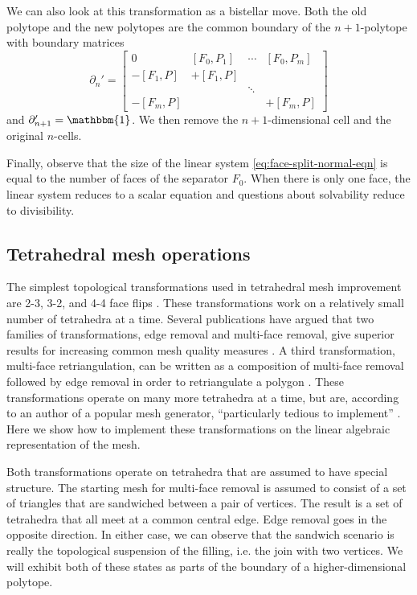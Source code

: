 \documentclass[twocolumn,leqno,twocolumn]{article}
\begin{document}
We can also look at this transformation as a bistellar move.
Both the old polytope and the new polytopes are the common boundary of the $n + 1$-polytope with boundary matrices
\begin{equation}
    \partial_n' = \left[\begin{matrix}0 & [F_0, P_1] & \cdots & [F_0, P_m] \\ -[F_1, P] & +[F_1, P] & & \\ & & \ddots & \\ -[F_m, P] & & & +[F_m, P]\end{matrix}\right]
\end{equation}
and $\partial_{n + 1}' = \mathbbm{1}$.
We then remove the $n + 1$-dimensional cell and the original $n$-cells.

Finally, observe that the size of the linear system \eqref{eq:face-split-normal-eqn} is equal to the number of faces of the separator $F_0$.
When there is only one face, the linear system reduces to a scalar equation and questions about solvability reduce to divisibility.

\subsection{Tetrahedral mesh operations}

The simplest topological transformations used in tetrahedral mesh improvement are 2-3, 3-2, and 4-4 face flips \cite{cheng2013delaunay}.
These transformations work on a relatively small number of tetrahedra at a time.
Several publications have argued that two families of transformations, edge removal and multi-face removal, give superior results for increasing common mesh quality measures \cite{klingner2008aggressive}.
A third transformation, multi-face retriangulation, can be written as a composition of multi-face removal followed by edge removal in order to retriangulate a polygon \cite{misztal2009tetrahedral}.
These transformations operate on many more tetrahedra at a time, but are, according to an author of a popular mesh generator, ``particularly tedious to implement'' \cite{marot2020reviving}.
Here we show how to implement these transformations on the linear algebraic representation of the mesh.

Both transformations operate on tetrahedra that are assumed to have special structure.
The starting mesh for multi-face removal is assumed to consist of a set of triangles that are sandwiched between a pair of vertices.
The result is a set of tetrahedra that all meet at a common central edge.
Edge removal goes in the opposite direction.
In either case, we can observe that the sandwich scenario is really the topological suspension of the filling, i.e. the join with two vertices.
We will exhibit both of these states as parts of the boundary of a higher-dimensional polytope.
\end{document}
